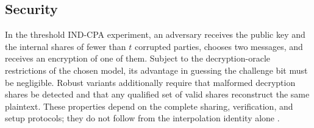 \subsection{Security}

In the threshold IND-CPA experiment, an adversary receives the public key and the internal shares of fewer than $t$ corrupted parties, chooses two messages, and receives an encryption of one of them. Subject to the decryption-oracle restrictions of the chosen model, its advantage in guessing the challenge bit must be negligible. Robust variants additionally require that malformed decryption shares be detected and that any qualified set of valid shares reconstruct the same plaintext. These properties depend on the complete sharing, verification, and setup protocols; they do not follow from the interpolation identity alone \cite{FouquePoupardStern2000,DamgardJurik2001}.
